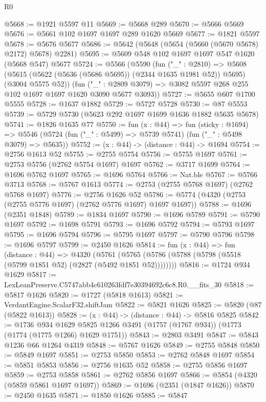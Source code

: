\begin{lexlean}{R0}
\begin{coremodule}
@5668 := @1921 @5597 @11
@5669 := @5668 @289
@5670 := @5666 @5669
@5676 := @5661 @102 @1697 @1697 @289 @1620 @5669
@5677 := @1821 @5597
@5678 := @5676 @5677
@5686 := @5642 (@5648 (@5654 (@5660 (@5670 @5678) @2172) @5678) @2281)
@5695 := @5609 @548 @102 @1697 @1697 @547 @1620 (@5668 @547) @5677
@5724 := @5566
    (@5590
      (fun ("_" : @2810) =>
      @5608 (@5615 (@5622 (@5636 (@5686 @5695)) (@2344 @1635 @1981 @52)) @5695) (@3004 @5575 @52))
      (fun ("_" : @2809 @3079) => @3082 @5597 @268 @255 @102 @1697 @1697 @1620 @3090 @5677 @3093))
@5727 := @5655 @607 @1700 @5555
@5728 := @1637 @1882
@5729 := @5727 @5728
@5730 := @87 @5553
@5739 := @5729 @5730 (@5623 @292 @1697 @1699 @1636 @1882 @5635 @5678)
@5741 := @1826 @1635 @77
@5750 := fun (x : @44) =>
  fun (sticky : @1694) =>
  @5546 (@5724 (fun ("_" : @5499) => @5739 @5741) (fun ("_" : @5498 @3079) => @5635))
@5752 := (x : @44) -> (distance : @44) -> @1694
@5754 := @2756 @1613 @52
@5755 := @2755 @5754
@5756 := @5755 @1697
@5761 := @2753 @5756 (@2762 @5754 @1697) @1697
@5762 := @3717 @1699
@5764 := @1696 @5762 @1697
@5765 := @1696 @5764
@5766 := Nat.ble
@5767 := @5766 @3713
@5768 := @5767 @1613
@5774 := @2753 (@2755 @5768 @1697) (@2762 @5768 @1697)
@5776 := @2756 @1626 @52
@5786 := @5774 (@4320 (@2753 (@2755 @5776 @1697) (@2762 @5776 @1697) @1697 @1697))
@5788 := @1696 (@2351 @1848)
@5789 := @1834 @1697
@5790 := @1696 @5789
@5791 := @5790 @1697
@5792 := @1698 @5791
@5793 := @1696 @5792
@5794 := @5793 @1697
@5795 := @1696 @5794
@5796 := @5795 @1697
@5797 := @5790 @5796
@5798 := @1696 @5797
@5799 := @2450 @1626
@5814 := fun (x : @44) =>
  fun (distance : @44) =>
  @4320 (@5761 (@5765 (@5786 (@5788 (@5798 (@5518 (@5799 @1851 @52) (@2827 (@5492 @1851 @52))))))))
@5816 := @1724 @934 @1629
@5817 := LexLeanPreserve.C5747abb4c610263fdf7e30394692c6c8.R0.__fits_30
@5818 := @5817 @1626
@5820 := @1727 (@5818 @1613)
@5821 := VerdantEngine.ScalarF32.shiftJam
@5822 := @5821 @1626
@5825 := @5820 (@87 (@5822 @1613))
@5828 := (x : @44) -> (distance : @44) -> @5816 @5825
@5842 := @1736
    @934
    @1629
    @5825
    @1266
    @3491
    (@1757 (@1767 @934))
    (@1773 (@1774 (@1775 @1266) @1629 @1751))
@5843 := @2803 @3491
@5847 := @5843 @1236 @66 @1264 @4319
@5848 := @5767 @1626
@5849 := @2755 @5848
@5850 := @5849 @1697
@5851 := @2753 @5850
@5853 := @2762 @5848 @1697
@5854 := @5851 @5853
@5856 := @2756 @1635 @52
@5858 := @2755 @5856 @1697
@5859 := @2753 @5858
@5861 := @2762 @5856 @1697
@5866 := @5854 (@4320 (@5859 @5861 @1697 @1697))
@5869 := @1696 (@2351 (@1847 @1626))
@5870 := @2450 @1635
@5871 := @1850 @1626
@5885 := @5847

\end{coremodule}
\end{lexlean}
